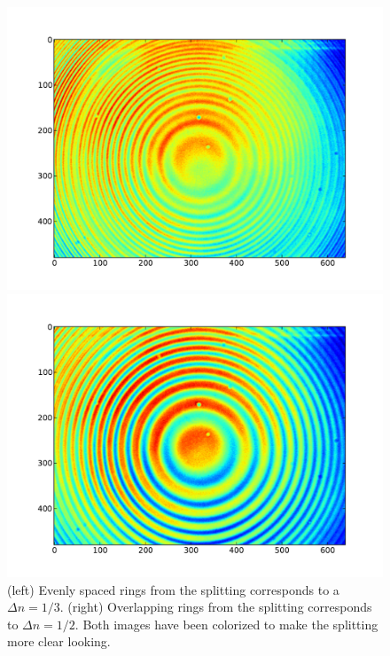 \documentclass[11pt,letterpaper]{article}
\begin{document}
\newpage

\begin{figure}
    \centering
    \begin{minipage}[t]{0.45\textwidth}
        \centering
        \includegraphics[width=\textwidth]{figures/Small9V_col.pdf}
    \end{minipage}
    \hspace{0.5em}
    \begin{minipage}[t]{0.45\textwidth}
        \centering
        \includegraphics[width=\textwidth]{figures/Small15V_col.pdf}
    \end{minipage}
    \caption{(left) Evenly spaced rings from the splitting corresponds to a
        $\Delta n = 1/3$.
    (right) Overlapping rings from the splitting corresponds to
    $\Delta n = 1/2$. Both images have been colorized to make the splitting more
    clear looking.}
    \label{zeefield}
\end{figure}
\end{document}

